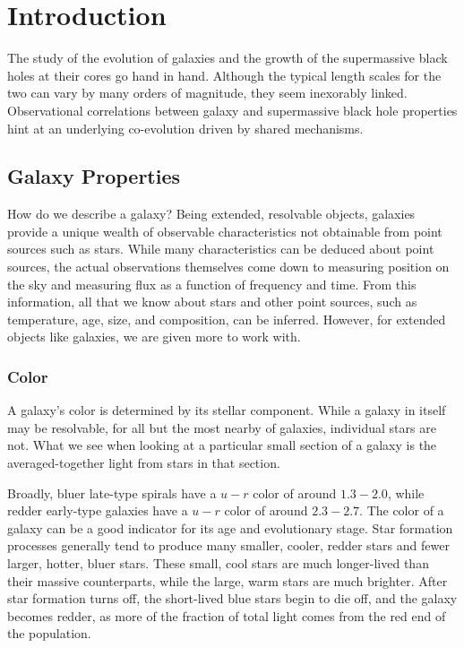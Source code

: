 
\section{Introduction}
\label{sec:introduction}

The study of the evolution of galaxies and the growth of the supermassive black holes at their cores go hand in hand.  Although the typical length scales for the two can vary by many orders of magnitude, they seem inexorably linked.  Observational correlations between galaxy and supermassive black hole properties hint at an underlying co-evolution driven by shared mechanisms.



\subsection{Galaxy Properties}

How do we describe a galaxy?  Being extended, resolvable objects, galaxies provide a unique wealth of observable characteristics not obtainable from point sources such as stars.  While many characteristics can be deduced about point sources, the actual observations themselves come down to measuring position on the sky and measuring flux as a function of frequency and time.  From this information, all that we know about stars and other point sources, such as temperature, age, size, and composition, can be inferred.  However, for extended objects like galaxies, we are given more to work with.


\subsubsection{Color}

A galaxy's color is determined by its stellar component.  While a galaxy in itself may be resolvable, for all but the most nearby of galaxies, individual stars are not.  What we see when looking at a particular small section of a galaxy is the averaged-together light from stars in that section.

Broadly, bluer late-type spirals have a $u-r$ color of around $1.3 - 2.0$, while redder early-type galaxies have a $u - r$ color of around $2.3 - 2.7$.  The color of a galaxy can be a good indicator for its age and evolutionary stage.  Star formation processes generally tend to produce many smaller, cooler, redder stars and fewer larger, hotter, bluer stars.  These small, cool stars are much longer-lived than their massive counterparts, while the large, warm stars are much brighter.  After star formation turns off, the short-lived blue stars begin to die off, and the galaxy becomes redder, as more of the fraction of total light comes from the red end of the population.




